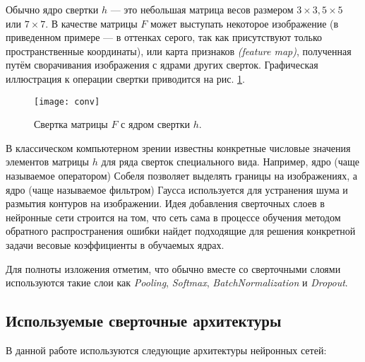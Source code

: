 \indent
\indent
Обычно ядро свертки $h$ --- это небольшая матрица весов размером
 $3\times3, 5\times5$ или $7\times7$. В качестве матрицы $F$ может выступать
 некоторое изображение (в приведенном примере --- в оттенках серого,
 так как присутствуют только пространственные координаты),
  или карта признаков \textit{(feature map)}, полученная 
путём сворачивания изображения с ядрами других сверток.
Графическая иллюстрация
к операции свертки приводится на рис. \ref{tikzpicture: conv}.


\begin{figure}[h!]
    \begin{center}
   	    \texttt{[image: conv]}
   	\end{center}
   	\caption{Свертка матрицы $F$ с ядром свертки $h$.}
   	\label{tikzpicture: conv}
\end{figure}


\indent
\indent
В классическом компьютерном зрении известны конкретные числовые
значения элементов матрицы $h$ для ряда сверток 
специального вида. Например, ядро (чаще называемое оператором) Собеля 
позволяет выделять границы на изображениях, а ядро (чаще
называемое фильтром) Гаусса используется для устранения шума
и размытия контуров на изображении. Идея добавления сверточных слоев в 
 нейронные сети строится на том, что сеть сама в процессе
обучения методом обратного распространения ошибки найдет подходящие
для решения конкретной задачи весовые коэффициенты в обучаемых ядрах.

\indent
\indent
Для полноты изложения отметим, что обычно вместе со сверточными
слоями используются такие 
слои как \textit{Pooling}, \textit{Softmax}, 
\textit{BatchNormalization}\cite{batchnorm}  и \textit{Dropout}\cite{dropout}.


\subsection{Используемые сверточные архитектуры}
\label{section:archs}

\indent
\indent
В данной работе используются следующие архитектуры нейронных сетей:


